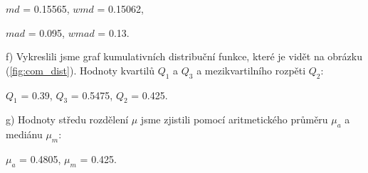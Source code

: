 \documentclass[a4paper,11pt]{article}
\begin{document}
\begin{minipage}[t]{0.5\textwidth}
\begin{center}
            \vspace{5pt}
            \par $md$ = 0.15565, $wmd$ = 0.15062,
            \vspace{5pt}
            \par $mad$ = 0.095, $wmad$ = 0.13.
        \end{center}
        \par f) Vykreslili jsme graf kumulativních distribuční funkce, které je vidět na obrázku (\ref{fig:com_dist}). Hodnoty kvartilů $Q_1$ a $Q_3$ a mezikvartilního rozpěti $Q_2$:
        \begin{center}
            $Q_1$ = 0.39, $Q_3$ = 0.5475, $Q_2$ = 0.425.
        \end{center}

        \par g) Hodnoty středu rozdělení $\mu$ jsme zjistili pomocí aritmetického průměru $\mu_a$ a mediánu $\mu_m$:
        \begin{center}
            $\mu_a$ = 0.4805, $\mu_m$ = 0.425.
        \end{center}
    \end{minipage}
    \hspace{10pt}
\end{document}
